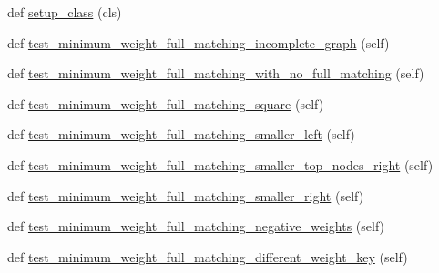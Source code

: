 \begin{DoxyCompactItemize}
\item 
def \hyperlink{classnetworkx_1_1algorithms_1_1bipartite_1_1tests_1_1test__matching_1_1TestMinimumWeightFullMatching_aae461b4b1feaa0e3f5b7253f941c9f5e}{setup\+\_\+class} (cls)
\item 
def \hyperlink{classnetworkx_1_1algorithms_1_1bipartite_1_1tests_1_1test__matching_1_1TestMinimumWeightFullMatching_ab53ca9612855193f9cca36711ddc23b0}{test\+\_\+minimum\+\_\+weight\+\_\+full\+\_\+matching\+\_\+incomplete\+\_\+graph} (self)
\item 
def \hyperlink{classnetworkx_1_1algorithms_1_1bipartite_1_1tests_1_1test__matching_1_1TestMinimumWeightFullMatching_af6a7bebeec255cd8358206cc069f568c}{test\+\_\+minimum\+\_\+weight\+\_\+full\+\_\+matching\+\_\+with\+\_\+no\+\_\+full\+\_\+matching} (self)
\item 
def \hyperlink{classnetworkx_1_1algorithms_1_1bipartite_1_1tests_1_1test__matching_1_1TestMinimumWeightFullMatching_aad8831d8299cd6b3af6591949b99d669}{test\+\_\+minimum\+\_\+weight\+\_\+full\+\_\+matching\+\_\+square} (self)
\item 
def \hyperlink{classnetworkx_1_1algorithms_1_1bipartite_1_1tests_1_1test__matching_1_1TestMinimumWeightFullMatching_a6307cf1fdf9276fa78e59709d5a4c8ce}{test\+\_\+minimum\+\_\+weight\+\_\+full\+\_\+matching\+\_\+smaller\+\_\+left} (self)
\item 
def \hyperlink{classnetworkx_1_1algorithms_1_1bipartite_1_1tests_1_1test__matching_1_1TestMinimumWeightFullMatching_a2c76e5bd387727583c95346750d019a0}{test\+\_\+minimum\+\_\+weight\+\_\+full\+\_\+matching\+\_\+smaller\+\_\+top\+\_\+nodes\+\_\+right} (self)
\item 
def \hyperlink{classnetworkx_1_1algorithms_1_1bipartite_1_1tests_1_1test__matching_1_1TestMinimumWeightFullMatching_aa7715c0cdd237da1969ef481295595dc}{test\+\_\+minimum\+\_\+weight\+\_\+full\+\_\+matching\+\_\+smaller\+\_\+right} (self)
\item 
def \hyperlink{classnetworkx_1_1algorithms_1_1bipartite_1_1tests_1_1test__matching_1_1TestMinimumWeightFullMatching_ac50fe02741425fd436bf9f53a3f03ccd}{test\+\_\+minimum\+\_\+weight\+\_\+full\+\_\+matching\+\_\+negative\+\_\+weights} (self)
\item 
def \hyperlink{classnetworkx_1_1algorithms_1_1bipartite_1_1tests_1_1test__matching_1_1TestMinimumWeightFullMatching_a69296876d73353a761223ac58c0a1b6f}{test\+\_\+minimum\+\_\+weight\+\_\+full\+\_\+matching\+\_\+different\+\_\+weight\+\_\+key} (self)
\end{DoxyCompactItemize}


